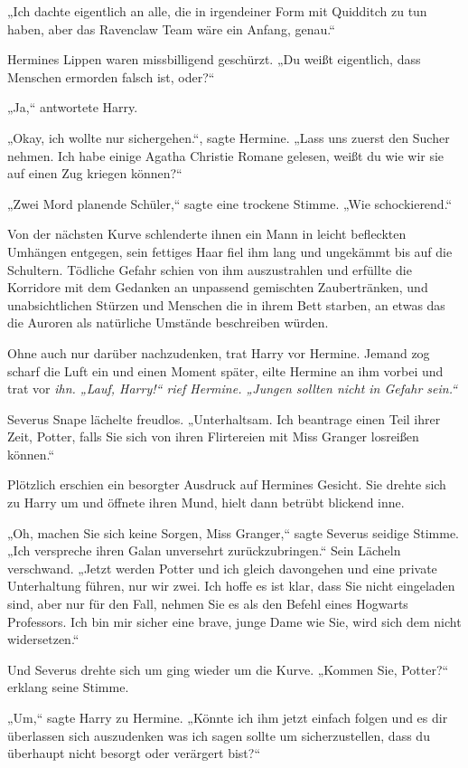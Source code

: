 {„Ich dachte eigentlich an alle, die in irgendeiner Form mit Quidditch zu tun haben, aber das Ravenclaw Team wäre ein Anfang, genau.“

Hermines Lippen waren missbilligend geschürzt. „Du weißt eigentlich, dass Menschen ermorden falsch ist, oder?“

„Ja,“ antwortete Harry.

„Okay, ich wollte nur sichergehen.“, sagte Hermine. „Lass uns zuerst den Sucher nehmen. Ich habe einige Agatha Christie Romane gelesen, weißt du wie wir sie auf einen Zug kriegen können?“

„Zwei Mord planende Schüler,“ sagte eine trockene Stimme. „Wie schockierend.“

Von der nächsten Kurve schlenderte ihnen ein Mann in leicht befleckten Umhängen entgegen, sein fettiges Haar fiel ihm lang und ungekämmt bis auf die Schultern. Tödliche Gefahr schien von ihm auszustrahlen und erfüllte die Korridore mit dem Gedanken an unpassend gemischten Zaubertränken, und unabsichtlichen Stürzen und Menschen die in ihrem Bett starben, an etwas das die Auroren als natürliche Umstände beschreiben würden.

Ohne auch nur darüber nachzudenken, trat Harry vor Hermine. Jemand zog scharf die Luft ein und einen Moment später, eilte Hermine an ihm vorbei und trat vor \emph{ihn. „Lauf, Harry!“ rief Hermine. „Jungen sollten nicht in Gefahr sein.“}

Severus Snape lächelte freudlos. „Unterhaltsam. Ich beantrage einen Teil ihrer Zeit, Potter, falls Sie sich von ihren Flirtereien mit Miss Granger losreißen können.“

Plötzlich erschien ein besorgter Ausdruck auf Hermines Gesicht. Sie drehte sich zu Harry um und öffnete ihren Mund, hielt dann betrübt blickend inne.

„Oh, machen Sie sich keine Sorgen, Miss Granger,“ sagte Severus seidige Stimme. „Ich verspreche ihren Galan unversehrt zurückzubringen.“ Sein Lächeln verschwand. „Jetzt werden Potter und ich gleich davongehen und eine private Unterhaltung führen, nur wir zwei. Ich hoffe es ist klar, dass Sie nicht eingeladen sind, aber nur für den Fall, nehmen Sie es als den Befehl eines Hogwarts Professors. Ich bin mir sicher eine brave, junge Dame wie Sie, wird sich dem nicht widersetzen.“

Und Severus drehte sich um ging wieder um die Kurve. „Kommen Sie, Potter?“ erklang seine Stimme.

„Um,“ sagte Harry zu Hermine. „Könnte ich ihm jetzt einfach folgen und es dir überlassen sich auszudenken was ich sagen sollte um sicherzustellen, dass du überhaupt nicht besorgt oder verärgert bist?“

}
